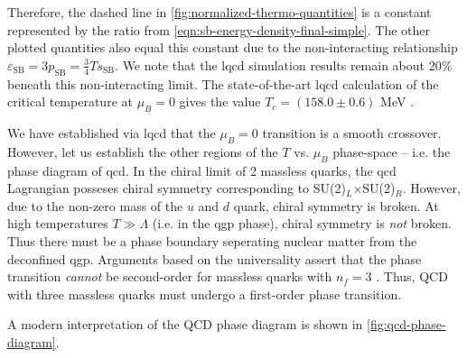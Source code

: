 Therefore, the dashed line in \ref{fig:normalized-thermo-quantities} is a constant represented by the ratio from \ref{eqn:sb-energy-density-final-simple}.
The other plotted quantities also equal this constant due to the non-interacting relationship $\varepsilon_{\text{SB}} = 3 p_{\text{SB}} = \frac{3}{4} T s_{\text{SB}}$.
We note that the \gls{lqcd} simulation results remain about 20\% beneath this non-interacting limit.
The state-of-the-art \gls{lqcd} calculation of the critical temperature at $\mu_B = 0$ gives the value $T_c = (158.0 \pm 0.6)$ MeV \cite{PhysRevLett.125.052001}.

We have established via \gls{lqcd} that the $\mu_B = 0$ transition is a smooth crossover.
However, let us establish the other regions of the $T$ vs. $\mu_B$ phase-space -- i.e. the phase diagram of \gls{qcd}.
In the chiral limit of 2 massless quarks, the \gls{qcd} Lagrangian posseses chiral symmetry corresponding to SU(2)$_L$$\times$SU(2)$_R$.
However, due to the non-zero mass of the $u$ and $d$ quark, chiral symmetry is broken.
At high temperatures $T \gg \Lambda$ (i.e. in the \gls{qgp} phase), chiral symmetry is \textit{not} broken.
Thus there must be a phase boundary seperating nuclear matter from the deconfined \gls{qgp}.
Arguments based on the universality assert that the phase transition \textit{cannot} be second-order for massless quarks with $n_f = 3$ \cite{Stephanov:2006zvm}.
Thus, QCD with three massless quarks must undergo a first-order phase transition.



A modern interpretation of the QCD phase diagram is shown in \ref{fig:qcd-phase-diagram}.


